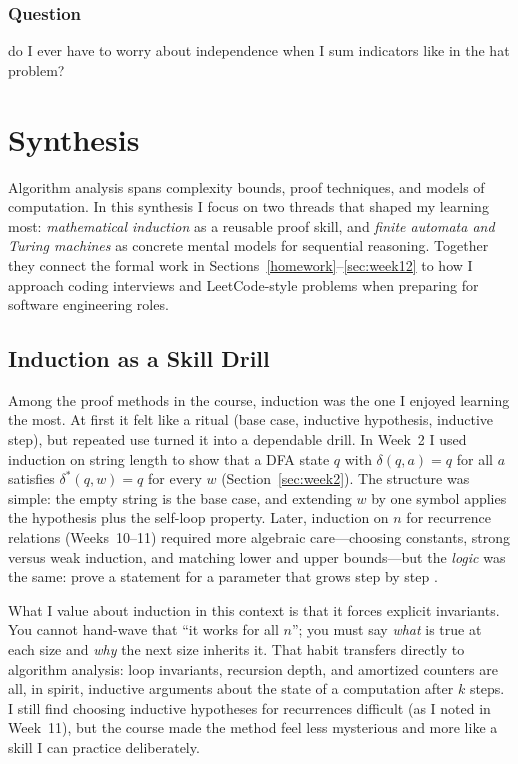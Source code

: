 \documentclass{article}
\theoremstyle{theorem}
\theoremstyle{definition}
\theoremstyle{remark}
\begin{document}
\subsubsection*{Question}
do I ever have to worry about independence when I sum indicators like in the hat problem?

\section{Synthesis}\label{synthesis}

Algorithm analysis spans complexity bounds, proof techniques, and models of computation. In this synthesis I focus on two threads that shaped my learning most: \emph{mathematical induction} as a reusable proof skill, and \emph{finite automata and Turing machines} as concrete mental models for sequential reasoning. Together they connect the formal work in Sections~\ref{homework}--\ref{sec:week12} to how I approach coding interviews and LeetCode-style problems when preparing for software engineering roles.

\subsection{Induction as a Skill Drill}\label{sec:synth-induction}

Among the proof methods in the course, induction was the one I enjoyed learning the most. At first it felt like a ritual (base case, inductive hypothesis, inductive step), but repeated use turned it into a dependable drill. In Week~2 I used induction on string length to show that a DFA state $q$ with $\delta(q,a)=q$ for all $a$ satisfies $\delta^*(q,w)=q$ for every $w$ (Section~\ref{sec:week2}). The structure was simple: the empty string is the base case, and extending $w$ by one symbol applies the hypothesis plus the self-loop property. Later, induction on $n$ for recurrence relations (Weeks~10--11) required more algebraic care---choosing constants, strong versus weak induction, and matching lower and upper bounds---but the \emph{logic} was the same: prove a statement for a parameter that grows step by step \cite{clrs}.

What I value about induction in this context is that it forces explicit invariants. You cannot hand-wave that ``it works for all $n$''; you must say \emph{what} is true at each size and \emph{why} the next size inherits it. That habit transfers directly to algorithm analysis: loop invariants, recursion depth, and amortized counters are all, in spirit, inductive arguments about the state of a computation after $k$ steps. I still find choosing inductive hypotheses for recurrences difficult (as I noted in Week~11), but the course made the method feel less mysterious and more like a skill I can practice deliberately.
\end{document}
